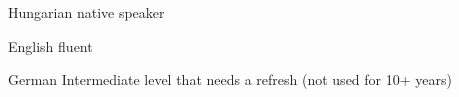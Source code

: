 

\begin{cvskills}


  \cvskill
    {Hungarian} %
    {native speaker} %


  \cvskill
    {English} %
    {fluent} %


  \cvskill
    {German} %
    {Intermediate level that needs a refresh (not used for 10+ years)} %


\end{cvskills}
